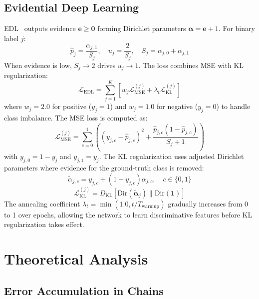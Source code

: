 \documentclass[conference]{IEEEtran}
\begin{document}
\subsection{Evidential Deep Learning}
    
EDL~\cite{sensoy2018evidential} outputs evidence $\mathbf{e} \ge \mathbf{0}$ forming Dirichlet parameters $\boldsymbol{\alpha} = \mathbf{e} + 1$. For binary label $j$:
\begin{equation}
\hat{p}_j = \frac{\alpha_{j,1}}{S_j}, \quad u_j = \frac{2}{S_j}, \quad S_j = \alpha_{j,0} + \alpha_{j,1}
\label{eq:edl_basic}
\end{equation}
When evidence is low, $S_j \to 2$ drives $u_j \to 1$. The loss combines MSE with KL regularization:
\begin{equation}
\mathcal{L}_{\mathrm{EDL}} = \sum_{j=1}^{K} \left[ w_j \mathcal{L}_{\mathrm{MSE}}^{(j)} + \lambda_t \mathcal{L}_{\mathrm{KL}}^{(j)} \right]
\label{eq:edl_loss}
\end{equation}
where $w_j = 2.0$ for positive ($y_j=1$) and $w_j=1.0$ for negative ($y_j=0$) to handle class imbalance. The MSE loss is computed as:
\begin{equation}
\mathcal{L}_{\mathrm{MSE}}^{(j)} = \sum_{c=0}^{1}\left((y_{j,c} - \hat{p}_{j,c})^2 + \frac{\hat{p}_{j,c}(1-\hat{p}_{j,c})}{S_j+1}\right)
\label{eq:mse_detailed}
\end{equation}
with $y_{j,0}=1-y_j$ and $y_{j,1}=y_j$. The KL regularization uses adjusted Dirichlet parameters where evidence for the ground-truth class is removed:
\begin{equation}
\tilde{\alpha}_{j,c} = y_{j,c} + (1-y_{j,c})\alpha_{j,c}, \quad c \in \{0,1\}
\label{eq:alpha_tilde}
\end{equation}
\begin{equation}
\mathcal{L}_{\mathrm{KL}}^{(j)} = D_{\mathrm{KL}}[\mathrm{Dir}(\tilde{\boldsymbol{\alpha}}_j) \| \mathrm{Dir}(\boldsymbol{1})]
\label{eq:kl_reg}
\end{equation}
The annealing coefficient $\lambda_t = \min(1.0, t/T_{\mathrm{warmup}})$ gradually increases from 0 to 1 over epochs, allowing the network to learn discriminative features before KL regularization takes effect.

\section{Theoretical Analysis}

\subsection{Error Accumulation in Chains}
\end{document}
